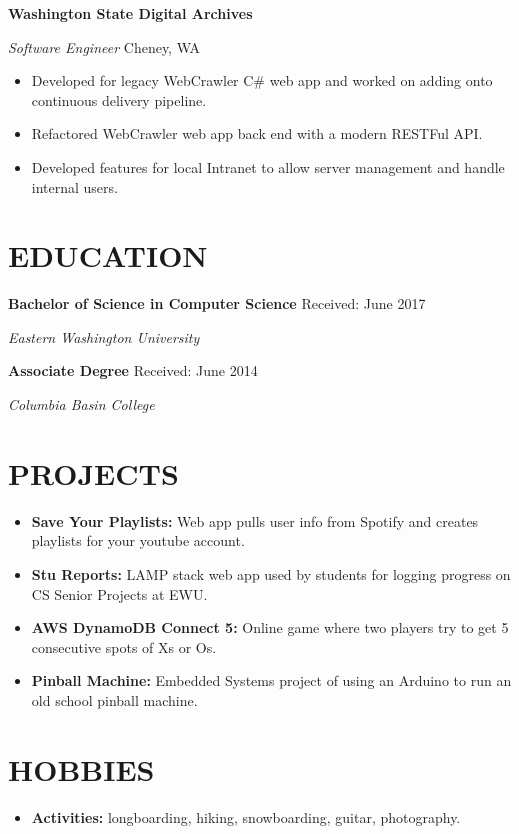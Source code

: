 \documentclass[paper=a4,fontsize=11pt]{scrartcl} %
\newlength{\spacebox}
\newcommand{\sepspace}{\vspace*{1em}}		%
\newcommand{\sepspacee}{\vspace*{.26em}}		%
\newcommand{\NewPart}[1]{\section*{\uppercase{#1}}}
\newcommand{\PersonalEntry}[2]{
		\noindent\hangindent=2em\hangafter=0 %
		\parbox{\spacebox}{        %
		\textit{\textbf{#1}}}		       %
		\hspace{1.5em} #2 \par}    %
\newcommand{\SkillsEntry}[2]{      %
		\begin{itemize}
        	\item \textbf{#1}{#2}
        \end{itemize}
        \sepspacee
}
\newcommand{\EducationEntry}[3]{
		\noindent \textbf{#1} \hfill      %
        {#2}
        
		\noindent \textit{#3} \par        %
		\normalsize \par}
\newcommand{\GroupWork}[1]{
		\noindent \textbf{#1} \hfill      %
        \normalsize \par}
\newcommand{\WorkEntry}[3]{				  %
		\textit{#1} \hfill      %
		{#2} \par  %
		\text{#3} \par              %
		\normalsize \par}
\begin{document}
\GroupWork{Washington State Digital Archives}
\WorkEntry{Software Engineer}{Cheney, WA}{April 2015 - April 2017 }
\SkillsEntry{}{Developed for legacy WebCrawler C\# web app and worked on adding onto continuous delivery pipeline.}
\SkillsEntry{}{Refactored WebCrawler web app back end with a modern RESTFul API.}
\SkillsEntry{}{Developed features for local Intranet to allow server management and handle internal users.}

\NewPart{Education}
 
\EducationEntry{Bachelor of Science in Computer Science}{Received: June 2017}{Eastern Washington University}
\sepspace
 
\EducationEntry{Associate Degree}{Received: June 2014}{Columbia Basin College}
 
\NewPart{PROJECTS}
\SkillsEntry{Save Your Playlists:}{ Web app pulls user info from Spotify and creates playlists for your youtube account. }
\SkillsEntry{Stu Reports:}{ LAMP stack web app used by students for logging progress on CS Senior Projects at EWU. }
\SkillsEntry{AWS DynamoDB Connect 5:}{ Online game where two players try to get 5 consecutive spots of Xs or Os.}
\SkillsEntry{Pinball Machine:}{ Embedded Systems project of using an Arduino to run an old school pinball machine.}


\NewPart{Hobbies}
\SkillsEntry{Activities:}{ longboarding, hiking, snowboarding, guitar, photography.}
\end{document}
